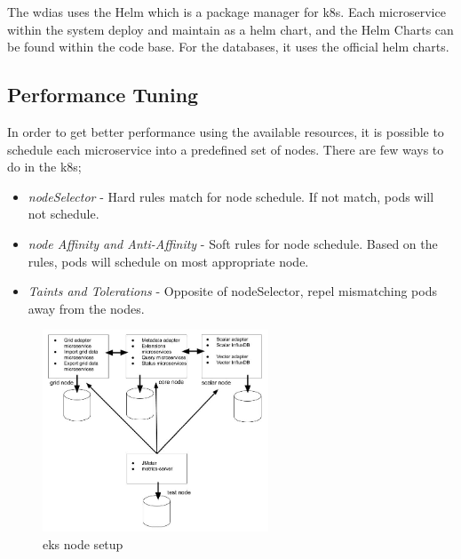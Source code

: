 The \acrshort{wdias} uses the Helm \cite{CNCFHelmDocs} which is a package manager for \acrshort{k8s}. Each microservice within the system deploy and maintain as a helm chart, and the Helm Charts \cite{KarunarathneWdias-helm-charts:Deployments} can be found within the code base. For the databases, it uses the official helm charts.


\subsection{Performance Tuning}
\label{se:performance_tuning}
In order to get better performance using the available resources, it is possible to schedule each microservice into a predefined set of nodes. There are few ways to do in the \acrshort{k8s};
\begin{itemize}
    \item \emph{nodeSelector} - Hard rules match for node schedule. If not match, pods will not schedule.
    \item \emph{node Affinity and Anti-Affinity} - Soft rules for node schedule. Based on the rules, pods will schedule on most appropriate node.
    \item \emph{Taints and Tolerations} - Opposite of nodeSelector, repel mismatching pods away from the nodes.
\end{itemize}

\begin{figure}[htp]
    \centering
    \includegraphics[width=0.6\textwidth]{results/work_load/eks_node_setup.jpg}
    \caption{\acrfull{eks} node setup}
    \label{fi:eks_node_setup}
\end{figure}

